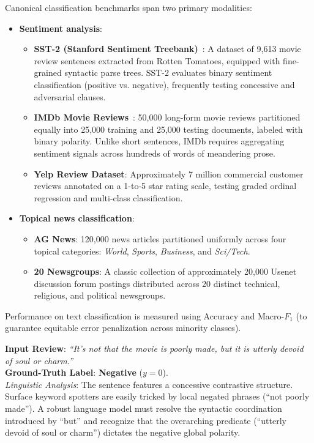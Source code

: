 \documentclass[../../main.tex]{subfiles}
\begin{document}
Canonical classification benchmarks span two primary modalities:
\begin{itemize}
    \item \textbf{Sentiment analysis}:
    \begin{itemize}
        \item \textbf{SST-2 (Stanford Sentiment Treebank)}~\cite{socher2013sst}: A dataset of 9,613 movie review sentences extracted from Rotten Tomatoes, equipped with fine-grained syntactic parse trees. SST-2 evaluates binary sentiment classification (positive vs. negative), frequently testing concessive and adversarial clauses.
        \item \textbf{IMDb Movie Reviews}~\cite{maas2011imdb}: 50,000 long-form movie reviews partitioned equally into 25,000 training and 25,000 testing documents, labeled with binary polarity. Unlike short sentences, IMDb requires aggregating sentiment signals across hundreds of words of meandering prose.
        \item \textbf{Yelp Review Dataset}: Approximately 7 million commercial customer reviews annotated on a 1-to-5 star rating scale, testing graded ordinal regression and multi-class classification.
    \end{itemize}
    \item \textbf{Topical news classification}:
    \begin{itemize}
        \item \textbf{AG News}: 120,000 news articles partitioned uniformly across four topical categories: \textit{World}, \textit{Sports}, \textit{Business}, and \textit{Sci/Tech}.
        \item \textbf{20 Newsgroups}: A classic collection of approximately 20,000 Usenet discussion forum postings distributed across 20 distinct technical, religious, and political newsgroups.
    \end{itemize}
\end{itemize}
Performance on text classification is measured using Accuracy and Macro-$F_1$ (to guarantee equitable error penalization across minority classes).

\begin{center}
\begin{minipage}{0.95\textwidth}
\begin{tcolorbox}[colback=cardBg,colframe=cardLine,arc=2pt,boxrule=0.5pt,title=\textbf{Task Example: Sentiment Classification (SST-2)}]
\small\sffamily
\textbf{Input Review}: \textit{``It's not that the movie is poorly made, but it is utterly devoid of soul or charm.''} \\
\textbf{Ground-Truth Label}: \textbf{Negative} ($y = 0$). \\
\textit{Linguistic Analysis}: The sentence features a concessive contrastive structure. Surface keyword spotters are easily tricked by local negated phrases (``not poorly made''). A robust language model must resolve the syntactic coordination introduced by ``but'' and recognize that the overarching predicate (``utterly devoid of soul or charm'') dictates the negative global polarity.
\end{tcolorbox}
\end{minipage}
\end{center}
\end{document}
